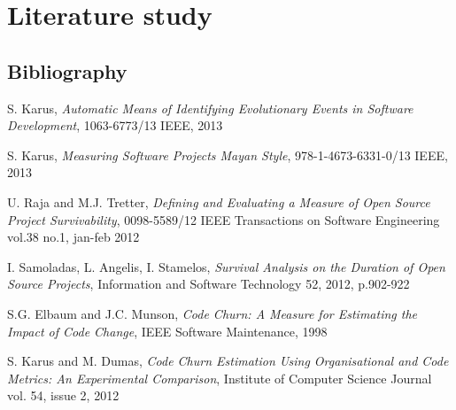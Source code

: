 \section{Literature study}

\subsection{Bibliography}
\begingroup
\renewcommand{\section}[2]{}%
\begin{thebibliography}{99}
	 S. Karus, \emph{Automatic Means of
	Identifying Evolutionary Events in Software Development}, 1063-6773/13 IEEE,
	2013

	 S. Karus, \emph{Measuring
	Software Projects Mayan Style}, 978-1-4673-6331-0/13 IEEE, 2013

	 U. Raja and M.J.
	Tretter, \emph{Defining and Evaluating a Measure of Open Source Project Survivability},
	0098-5589/12 IEEE Transactions on Software Engineering vol.38 no.1, jan-feb
	2012

	 I. Samoladas, L. Angelis, I.
	Stamelos, \emph{Survival Analysis on the Duration of Open Source Projects},
	Information and Software Technology 52, 2012, p.902-922

	 S.G. Elbaum and J.C. Munson, \emph{Code Churn: A Measure
	for Estimating the Impact of Code Change}, IEEE Software Maintenance, 1998

	 S. Karus and M. Dumas, \emph{Code Churn Estimation Using
	Organisational and Code Metrics: An Experimental Comparison}, Institute of
	Computer Science Journal vol. 54, issue 2, 2012

\end{thebibliography}
\endgroup
